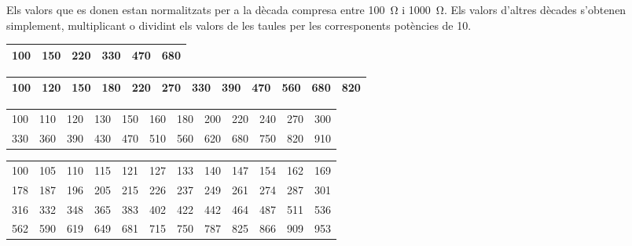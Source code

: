 Els valors que es donen estan normalitzats per a la dècada compresa
entre \SI{100}{\ohm} i \SI{1000}{\ohm}. Els valors d'altres dècades
s'obtenen simplement, multiplicant o dividint els valors de les
taules per les corresponents  potències de 10.

\begin{center}
   \begin{tabular}{cccccc}
   \toprule[1pt]
   100 & 150 & 220 & 330 & 470 &  680  \\
   \bottomrule[1pt]
   \end{tabular}
\end{center}
\vspace{5mm}

\begin{center}
   \begin{tabular}{cccccccccccc}
   \toprule[1pt]
   100 & 120 & 150 & 180 & 220 & 270 & 330 & 390 & 470 & 560 & 680 & 820 \\
   \bottomrule[1pt]
   \end{tabular}
\end{center}
\vspace{5mm}

\begin{center}
   \begin{tabular}{cccccccccccc}
   \toprule[1pt]
   100 & 110 & 120 & 130 & 150 & 160 & 180 & 200 & 220 & 240 & 270 & 300 \\
   330 & 360 & 390 & 430 & 470 & 510 & 560 & 620 & 680 & 750 & 820 & 910 \\
   \bottomrule[1pt]
   \end{tabular}
\end{center}
\vspace{5mm}

\begin{center}
   \begin{tabular}{cccccccccccc}
   \toprule[1pt]
   100 & 105 & 110 & 115 & 121 & 127 & 133 & 140 & 147 & 154 & 162 & 169 \\
   178 & 187 & 196 & 205 & 215 & 226 & 237 & 249 & 261 & 274 & 287 & 301 \\
   316 & 332 & 348 & 365 & 383 & 402 & 422 & 442 & 464 & 487 & 511 & 536 \\
   562 & 590 & 619 & 649 & 681 & 715 & 750 & 787 & 825 & 866 & 909 & 953 \\
   \bottomrule[1pt]
   \end{tabular}
\end{center}
\vspace{5mm}

